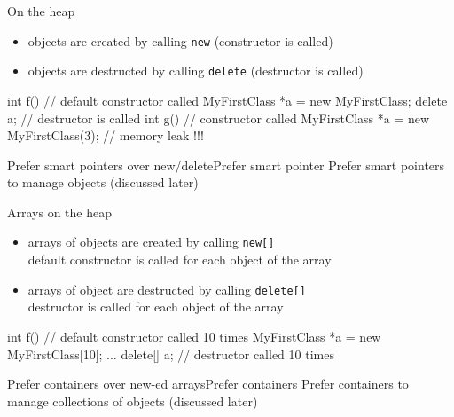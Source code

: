 \begin{frame}[fragile]
  \begin{block}{On the heap}
    \begin{itemize}
    \item objects are created by calling \texttt{new} (constructor is called)
    \item objects are destructed by calling \texttt{delete} (destructor is called)
    \end{itemize}
  \end{block}
  \begin{cppcode}
    int f() {
      // default constructor called
      MyFirstClass *a = new MyFirstClass;
      delete a; // destructor is called
    }
    int g() {
      // constructor called
      MyFirstClass *a = new MyFirstClass(3);
    } // memory leak !!!
  \end{cppcode}
  \begin{goodpracticeWithShortcut}{Prefer smart pointers over new/delete}{Prefer smart pointer}
    Prefer smart pointers to manage objects (discussed later)
  \end{goodpracticeWithShortcut}
\end{frame}

\begin{frame}[fragile]
  \begin{block}{Arrays on the heap}
    \begin{itemize}
    \item arrays of objects are created by calling \texttt{new[]} \\
      default constructor is called for each object of the array
    \item arrays of object are destructed by calling \texttt{delete[]} \\
      destructor is called for each object of the array
    \end{itemize}
  \end{block}
  \begin{cppcode}
    int f() {
      // default constructor called 10 times
      MyFirstClass *a = new MyFirstClass[10];
      ...
      delete[] a; // destructor called 10 times
    }
  \end{cppcode}
  \begin{goodpracticeWithShortcut}{Prefer containers over new-ed arrays}{Prefer containers}
    Prefer containers to manage collections of objects (discussed later)
  \end{goodpracticeWithShortcut}
\end{frame}
